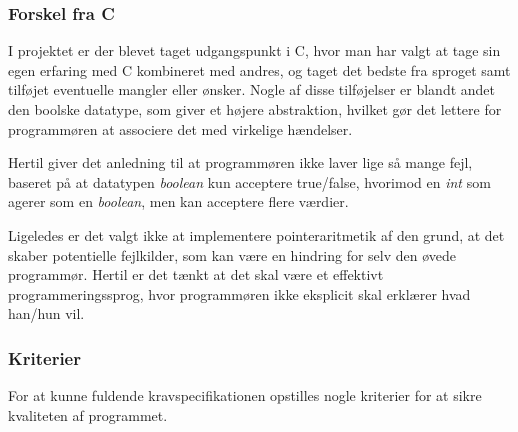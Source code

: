 \subsubsection{Forskel fra C}
\label{sec:forskelfrac}
I projektet er der blevet taget udgangspunkt i C, hvor man har valgt at tage sin egen erfaring med C kombineret med andres, og taget det bedste fra sproget samt tilføjet eventuelle mangler eller ønsker.
Nogle af disse tilføjelser er blandt andet den boolske datatype, som giver et højere abstraktion, hvilket gør det  lettere for programmøren at associere det med virkelige hændelser.

Hertil giver det anledning til at programmøren ikke laver lige så mange fejl, baseret på at datatypen \textit{boolean} kun acceptere true/false, hvorimod en \textit{int} som agerer som en \textit{boolean}, men kan acceptere flere værdier.

Ligeledes er det valgt ikke at implementere pointeraritmetik af den grund, at det skaber potentielle fejlkilder, som kan være en hindring for selv den øvede programmør. Hertil er det tænkt at det skal være et effektivt programmeringssprog, hvor programmøren ikke eksplicit skal erklærer hvad han/hun vil.

\subsubsection{Kriterier}
For at kunne fuldende kravspecifikationen opstilles nogle kriterier for at sikre kvaliteten af programmet.
